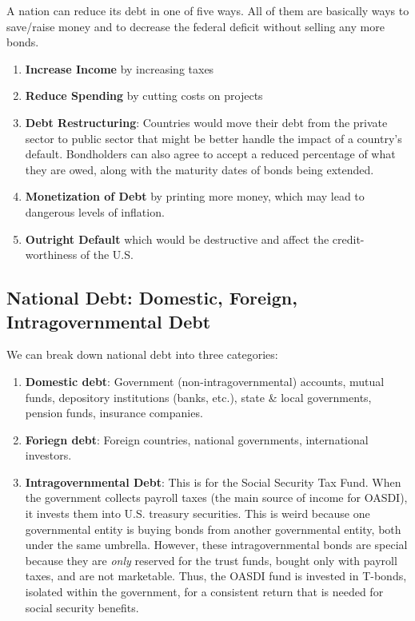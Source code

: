 \documentclass{article}
\begin{document}
    A nation can reduce its debt in one of five ways. All of them are basically ways to save/raise money and to decrease the federal deficit without selling any more bonds.
    \begin{enumerate}
      \item \textbf{Increase Income} by increasing taxes
      \item \textbf{Reduce Spending} by cutting costs on projects
      \item \textbf{Debt Restructuring}: Countries would move their debt from the private sector to public sector that might be better handle the impact of a country's default. Bondholders can also agree to accept a reduced percentage of what they are owed, along with the maturity dates of bonds being extended.
      \item \textbf{Monetization of Debt} by printing more money, which may lead to dangerous levels of inflation.
      \item \textbf{Outright Default} which would be destructive and affect the credit-worthiness of the U.S.
    \end{enumerate}

  \subsection{National Debt: Domestic, Foreign, Intragovernmental Debt}

    We can break down national debt into three categories:

    \begin{enumerate}
      \item \textbf{Domestic debt}: Government (non-intragovernmental) accounts, mutual funds, depository institutions (banks, etc.), state \& local governments, pension funds, insurance companies.
      \item \textbf{Foriegn debt}: Foreign countries, national governments, international investors.
      \item \textbf{Intragovernmental Debt}: This is for the Social Security Tax Fund. When the government collects payroll taxes (the main source of income for OASDI), it invests them into U.S. treasury securities. This is weird because one governmental entity is buying bonds from another governmental entity, both under the same umbrella. However, these intragovernmental bonds are special because they are \textit{only} reserved for the trust funds, bought only with payroll taxes, and are not marketable. Thus, the OASDI fund is invested in T-bonds, isolated within the government, for a consistent return that is needed for social security benefits.
    \end{enumerate}
\end{document}
